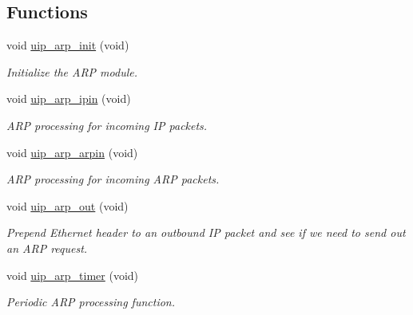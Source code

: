 \subsection*{Functions}
\begin{CompactItemize}
\item 
\hypertarget{a00067_g2d9d28afa353f662b9bb5234fc419f72}{
void \hyperlink{a00067_g2d9d28afa353f662b9bb5234fc419f72}{uip\_\-arp\_\-init} (void)}
\label{a00067_g2d9d28afa353f662b9bb5234fc419f72}

\begin{CompactList}\small\item\em Initialize the ARP module. \item\end{CompactList}\item 
void \hyperlink{a00067_g5cf8d6974a89ad67c5faf9b19261cb7c}{uip\_\-arp\_\-ipin} (void)
\begin{CompactList}\small\item\em ARP processing for incoming IP packets. \item\end{CompactList}\item 
void \hyperlink{a00067_g902c4a360134096224bc2655f623aa5f}{uip\_\-arp\_\-arpin} (void)
\begin{CompactList}\small\item\em ARP processing for incoming ARP packets. \item\end{CompactList}\item 
void \hyperlink{a00067_g54b27e45df15e10a0eb1a3e3a91417d2}{uip\_\-arp\_\-out} (void)
\begin{CompactList}\small\item\em Prepend Ethernet header to an outbound IP packet and see if we need to send out an ARP request. \item\end{CompactList}\item 
void \hyperlink{a00067_g058a8e6025f67b021862281f1911fcef}{uip\_\-arp\_\-timer} (void)
\begin{CompactList}\small\item\em Periodic ARP processing function. \item\end{CompactList}\end{CompactItemize}
